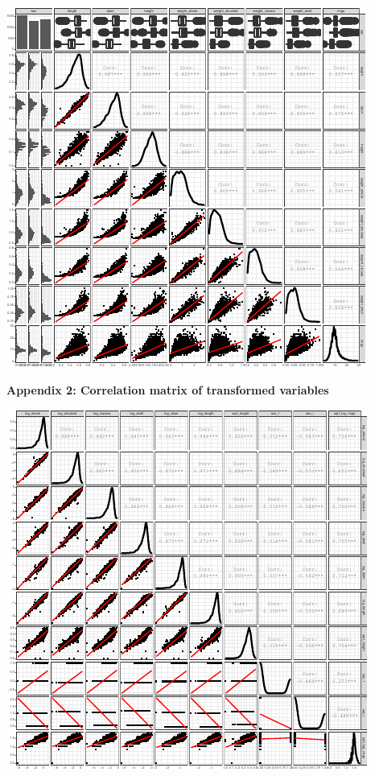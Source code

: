 \documentclass[letterpaper,9pt,twocolumn,twoside,]{pinp}
\begin{document}
\begin{center}\includegraphics{ExecSum_files/figure-latex/unnamed-chunk-9-1} \end{center}

\textbf{Appendix 2: Correlation matrix of transformed variables}

\begin{center}\includegraphics{ExecSum_files/figure-latex/unnamed-chunk-10-1} \end{center}
\end{document}
